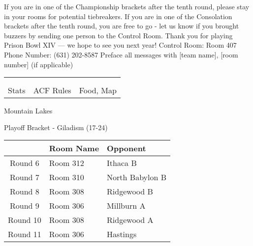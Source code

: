\documentclass{article}%
\begin{document}
\vspace*{30pt}%
\linebreak%
If you are in one of the Championship brackets after the tenth round, please stay in your rooms for potential tiebreakers.\newline%
\newline%
If you are in one of the Consolation brackets after the tenth round, you are free to go {-} let us know if you brought buzzers by sending one person to the Control Room.\newline%
\newline%
Thank you for playing Prison Bowl XIV — we hope to see you next year!\newline%
\newline%
Control Room: Room 407\newline%
Phone Number: (631) 202{-}8587\newline%
Preface all messages with {[}team name{]}, {[}room number{]} (if applicable)%
\vspace*{30pt}%
\newline%
%
\begin{tabularx}{\textwidth}{YYY}%
  &  &  \\%
\\%
Stats&ACF Rules&Food, Map\\%
\end{tabularx}%
\newpage%
\begin{center}%
\begin{Huge}%
Mountain Lakes%
\end{Huge}%
\vspace*{12pt}%
\linebreak%
\begin{Large}%
Playoff Bracket {-} Giladism (17{-}24)%
\end{Large}%
\end{center}%
\vspace*{4pt}%
%
\begin{tabularx}{\textwidth}{|c|Y|Y|}%
\hline%
&Room Name&Opponent\\%
\hline%
Round 6&Room 312&Ithaca B\\%
Round 7&Room 310&North Babylon B\\%
Round 8&Room 308&Ridgewood B\\%
Round 9&Room 306&Millburn A\\%
Round 10&Room 308&Ridgewood A\\%
Round 11&Room 306&Hastings\\%
\hline%
\end{tabularx}%
\end{document}
